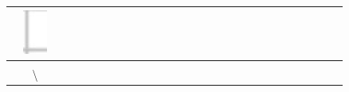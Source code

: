 \documentclass[10pt]{article}
\begin{document}
\begin{center}
\begin{tabular}{|c|c|c|c|c|c|c|c|c|c|c|c|c|c|c|c|c|c|c|c|c|c|c|c|c|c|c|c|}
 & \includegraphics[max width=\textwidth]{2024_11_21_ba65d61981011633d840g-14}
 &  &  &  &  &  &  &  &  &  &  &  &  &  &  &  &  &  &  &  &  &  &  &  &  &  &  \\
\hline
 &  &  &  &  &  &  &  &  &  &  &  &  &  &  &  &  &  &  &  &  &  &  &  &  &  &  &  \\
\hline
 & \textbackslash  &  &  &  &  &  &  &  &  &  &  &  &  &  &  &  &  &  &  &  &  &  &  &  &  &  &  \\

\end{tabular}
\end{center}
\end{document}
